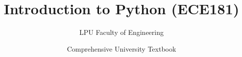 \documentclass[a4paper,11pt,oneside,openany]{book}
\title{Introduction to Python (ECE181)}
\author{LPU Faculty of Engineering}
\date{Comprehensive University Textbook}
\begin{document}
\frontmatter

\makebookcover
\copyrightpage
\disclaimerpage

\tableofcontents
\newpage

\mainmatter







\end{document}
